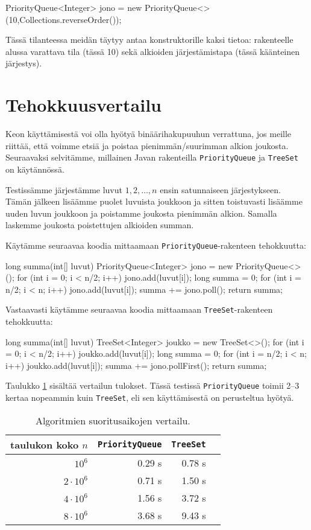 \begin{code}
PriorityQueue<Integer> jono =
    new PriorityQueue<>(10,Collections.reverseOrder());
\end{code}

Tässä tilanteessa meidän täytyy antaa konstruktorille kaksi tietoa:
rakenteelle alussa varattava tila (tässä 10)
sekä alkioiden järjestämistapa (tässä käänteinen järjestys).

\section{Tehokkuusvertailu}

Keon käyttämisestä voi olla hyötyä binäärihakupuuhun verrattuna,
jos meille riittää, että voimme etsiä ja poistaa pienimmän/suurimman alkion
joukosta.
Seuraavaksi selvitämme, millainen Javan rakenteilla
\texttt{PriorityQueue} ja \texttt{TreeSet} on käytännössä.

Testissämme järjestämme luvut $1,2,\dots,n$ ensin satunnaiseen järjestykseen.
Tämän jälkeen lisäämme puolet luvuista joukkoon
ja sitten toistuvasti lisäämme uuden luvun joukkoon
ja poistamme joukosta pienimmän alkion.
Samalla laskemme joukosta poistettujen alkioiden summan.

Käytämme seuraavaa koodia mittaamaan \texttt{PriorityQueue}-rakenteen tehokkuutta:

\begin{code}
long summa(int[] luvut) {
    PriorityQueue<Integer> jono = new PriorityQueue<>();
    for (int i = 0; i < n/2; i++) {
        jono.add(luvut[i]);
    }
    long summa = 0;
    for (int i = n/2; i < n; i++) {
        jono.add(luvut[i]);
        summa += jono.poll();
    }
    return summa;
}
\end{code}

Vastaavasti käytämme seuraavaa koodia mittaamaan \texttt{TreeSet}-rakenteen tehokkuutta:

\begin{code}
long summa(int[] luvut) {
    TreeSet<Integer> joukko = new TreeSet<>();
    for (int i = 0; i < n/2; i++) {
        joukko.add(luvut[i]);
    }
    long summa = 0;
    for (int i = n/2; i < n; i++) {
        joukko.add(luvut[i]);
        summa += jono.pollFirst();
    }
    return summa;
}
\end{code}

Taulukko \ref{tab:kekver} sisältää vertailun tulokset.
Tässä testissä \texttt{PriorityQueue} toimii 2–3
kertaa nopeammin kuin \texttt{TreeSet},
eli sen käyttämisestä on perusteltua hyötyä.

\begin{table}
\center
\begin{tabular}{rrrr}
taulukon koko $n$ & \texttt{PriorityQueue} & \texttt{TreeSet} \\
\hline
$10^6$ & 0.29 s & 0.78 s \\
$2 \cdot 10^6$ & 0.71 s & 1.50 s \\
$4 \cdot 10^6$ & 1.56 s & 3.72 s \\
$8 \cdot 10^6$ & 3.68 s & 9.43 s \\
\end{tabular}
\caption{Algoritmien suoritusaikojen vertailu.}
\label{tab:kekver}
\end{table}